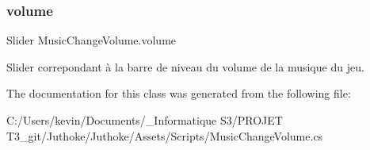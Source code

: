 \subsubsection{\texorpdfstring{volume}{volume}}
{\footnotesize\ttfamily Slider Music\+Change\+Volume.\+volume}

Slider correpondant à la barre de niveau du volume de la musique du jeu. 

The documentation for this class was generated from the following file\+:\begin{DoxyCompactItemize}
\item 
C\+:/\+Users/kevin/\+Documents/\+\_\+\+Informatique S3/\+P\+R\+O\+J\+E\+T T3\+\_\+git/\+Juthoke/\+Juthoke/\+Assets/\+Scripts/Music\+Change\+Volume.\+cs\end{DoxyCompactItemize}

